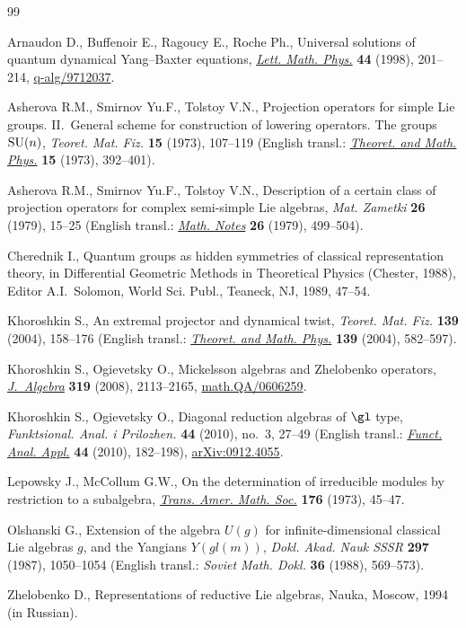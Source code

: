 \documentclass[pdftex]{sigma}
\numberwithin{equation}{section}
\begin{document}
\begin{thebibliography}{99}
\footnotesize\itemsep=0pt

Arnaudon D., Buf\/fenoir E., Ragoucy E., Roche Ph.,
Universal solutions of quantum dynamical Yang--Baxter equations,
\href{http://dx.doi.org/10.1023/A:1007498022373}{{\it Lett. Math. Phys.}} {\bf 44} (1998), 201--214,
\href{http://arxiv.org/abs/q-alg/9712037}{q-alg/9712037}.

Asherova R.M., Smirnov  Yu.F., Tolstoy V.N.,
Projection operators for simple Lie groups. II.~General scheme for construction of lowering operators. The groups ${\rm SU}(n)$,
  {\it Teoret. Mat. Fiz.} {\bf 15} (1973), 107--119 (English transl.: \href{http://dx.doi.org/10.1007/BF01028268}{{\it Theoret. and Math. Phys.}} {\bf 15} (1973), 392--401).

Asherova R.M., Smirnov Yu.F., Tolstoy V.N.,
Description of a certain class of projection operators for complex semi-simple Lie algebras,
{\it Mat. Zametki} {\bf 26} (1979), 15--25 (English transl.: \href{http://dx.doi.org/10.1007/BF01140268}{{\it Math. Notes}} {\bf 26} (1979),   499--504).


Cherednik I.,
Quantum groups as hidden symmetries of classical representation theory,
in Dif\/ferential Geometric Methods in Theoretical Physics (Chester, 1988), Editor A.I.~Solomon,
World Sci. Publ., Teaneck, NJ, 1989, 47--54.

Khoroshkin S.,
An extremal projector and dynamical twist,
{\it Teoret. Mat. Fiz.} {\bf 139} (2004),  158--176
(English transl.: \href{http://dx.doi.org/10.1023/B:TAMP.0000022749.42512.fd}{{\it Theoret. and Math. Phys.}} {\bf 139} (2004),   582--597).


 Khoroshkin  S., Ogievetsky O.,
Mickelsson algebras and Zhelobenko operators,
\href{http://dx.doi.org/10.1016/j.jalgebra.2007.04.020}{{\it J.~Algebra}} {\bf 319} (2008), 2113--2165,
\href{http://arxiv.org/abs/math.QA/0606259}{math.QA/0606259}.

Khoroshkin  S., Ogievetsky O.,
Diagonal reduction algebras of $\gl$ type,
{\it Funktsional. Anal. i Prilozhen.} {\bf 44} (2010), no.~3, 27--49  (English transl.: \href{http://dx.doi.org/10.1007/s10688-010-0023-0}{{\it Funct. Anal. Appl.}} {\bf 44} (2010),  182--198),
\href{http://arxiv.org/abs/0912.4055}{arXiv:0912.4055}.

Lepowsky J., McCollum G.W.,
On the determination of irreducible modules by restriction to a subalgebra,
\href{http://www.ams.org/leavingmsn?url=http://dx.doi.org/10.2307/1996195}{{\it Trans. Amer. Math. Soc.}} {\bf 176} (1973), 45--47.

Olshanski G.,
Extension of the algebra $U(g)$ for inf\/inite-dimensional classical Lie algebras $g$, and the Yangians $Y(gl(m))$,
{\it Dokl. Akad. Nauk SSSR} {\bf 297} (1987),  1050--1054 (English transl.: {\it Soviet Math. Dokl.} {\bf 36} (1988),   569--573).

Zhelobenko D.,
Representations of reductive Lie algebras, Nauka, Moscow, 1994 (in Russian).

\end{thebibliography}\LastPageEnding
\end{document}
